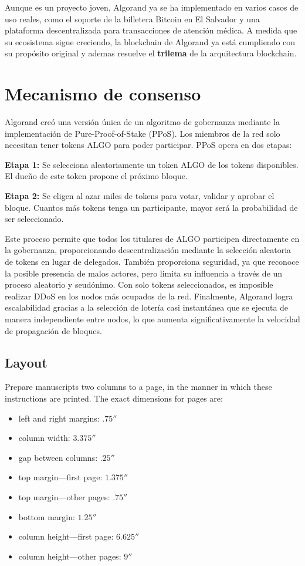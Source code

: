 \documentclass{article}
\begin{document}
Aunque es un proyecto joven, Algorand ya se ha implementado en varios casos de uso reales, como el soporte de la billetera Bitcoin en El Salvador y una plataforma descentralizada para transacciones de atención médica. A medida que su ecosistema sigue creciendo, la blockchain de Algorand ya está cumpliendo con su propósito original y ademas resuelve el \textbf{trilema} de la arquitectura blockchain.


\section{Mecanismo de consenso}

Algorand creó una versión única de un algoritmo de gobernanza mediante la implementación de Pure-Proof-of-Stake (PPoS). Los miembros de la red solo necesitan tener tokens ALGO para poder participar. PPoS opera en dos etapas:

\textbf{Etapa 1:} Se selecciona aleatoriamente un token ALGO de los tokens disponibles. El dueño de este token propone el próximo bloque.

\textbf{Etapa 2:} Se eligen al azar miles de tokens para votar, validar y aprobar el bloque. Cuantos más tokens tenga un participante, mayor será la probabilidad de ser seleccionado.

Este proceso permite que todos los titulares de ALGO participen directamente en la gobernanza, proporcionando descentralización mediante la selección aleatoria de tokens en lugar de delegados. También proporciona seguridad, ya que reconoce la posible presencia de malos actores, pero limita su influencia a través de un proceso aleatorio y seudónimo. Con solo tokens seleccionados, es imposible realizar DDoS en los nodos más ocupados de la red. Finalmente, Algorand logra escalabilidad gracias a la selección de lotería casi instantánea que se ejecuta de manera independiente entre nodos, lo que aumenta significativamente la velocidad de propagación de bloques.

\subsection{Layout}

Prepare manuscripts two columns to a page, in the manner in which these
instructions are printed.  The exact dimensions for pages are:
\begin{itemize}
\item left and right margins: $.75''$
\item column width: $3.375''$
\item gap between columns: $.25''$
\item top margin---first page: $1.375''$
\item top margin---other pages: $.75''$
\item bottom margin: $1.25''$
\item column height---first page: $6.625''$
\item column height---other pages: $9''$
\end{itemize}
\end{document}
